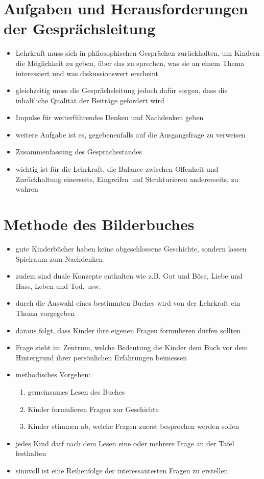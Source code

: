 \newpage
\section{Aufgaben und Herausforderungen der Gesprächsleitung}
\begin{itemize}
	\item{Lehrkraft muss sich in philosophischen Gesprächen zurückhalten, um Kindern die Möglichkeit zu geben, über das zu sprechen, was sie an einem Thema interessiert und was diskussionswert erscheint}
	\item{gleichzeitig muss die Gesprächsleitung jedoch dafür sorgen, dass die inhaltliche Qualität der Beiträge gefördert wird}
	\item{Impulse für weiterführendes Denken und Nachdenken geben}
	\item{weitere Aufgabe ist es, gegebenenfalls auf die Ausgangsfrage zu verweisen}
	\item{Zusammenfassung des Gesprächsstandes}
	\item{wichtig ist für die Lehrkraft, die Balance zwischen Offenheit und Zurückhaltung einerseits, Eingreifen und Strukturieren andererseits, zu wahren}
\end{itemize}

\newpage
\section{Methode des Bilderbuches}
\begin{itemize}
	\item{gute Kinderbücher haben keine abgeschlossene Geschichte, sondern lassen Spielraum zum Nachdenken}
	\item{zudem sind duale Konzepte enthalten wie z.B. Gut und Böse, Liebe und Hass, Leben und Tod, usw.} 
	\item{durch die Auswahl eines bestimmten Buches wird von der Lehrkraft ein Thema vorgegeben}
	\item{daraus folgt, dass Kinder ihre eigenen Fragen formulieren dürfen sollten}
	\item{Frage steht im Zentrum, welche Bedeutung die Kinder dem Buch vor dem Hintergrund ihrer persönlichen Erfahrungen beimessen}
	\item{methodisches Vorgehen:
		\begin{enumerate}
		\item{gemeinsames Lesen des Buches}
		\item{Kinder formulieren Fragen zur Geschichte}
		\item{Kinder stimmen ab, welche Fragen zuerst besprochen werden sollen}
		\end{enumerate}
	}
	\item{jedes Kind darf nach dem Lesen eine oder mehrere Frage an der Tafel festhalten}
	\item{sinnvoll ist eine Reihenfolge der interessantesten Fragen zu erstellen}
\end{itemize}

